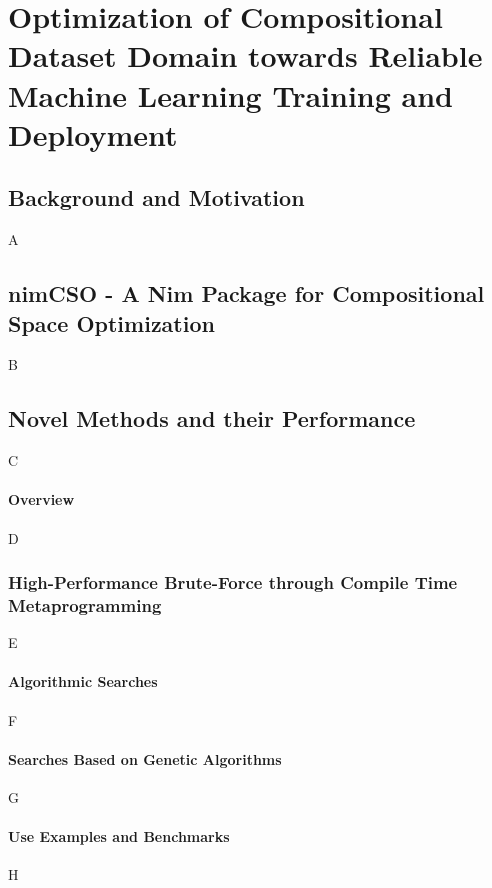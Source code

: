\chapter{Optimization of Compositional Dataset Domain towards Reliable Machine Learning Training and Deployment} \label{chap:nimcso}

\section{Background and Motivation} \label{sec:background}


A



\section{nimCSO - A Nim Package for Compositional Space Optimization} \label{sec:nimcsosoftware}


B

\section{Novel Methods and their Performance}




C

\subsubsection{Overview}

D




\subsection{High-Performance Brute-Force through Compile Time Metaprogramming}

E




\subsubsection{Algorithmic Searches}

F




\subsubsection{Searches Based on Genetic Algorithms}

G





\subsubsection{Use Examples and Benchmarks}

H





\printbibliography[heading=subbibintoc]